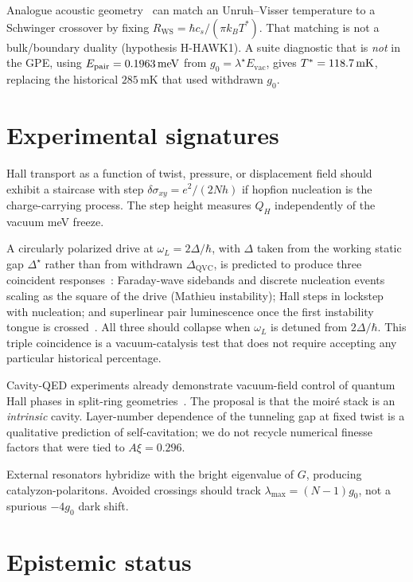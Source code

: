 \documentclass[11pt,letterpaper]{article}
\begin{document}
Analogue acoustic geometry~\cite{Unruh1981,Barcelo2011,Volovik2003,Steinhauer2016} can match an Unruh--Visser temperature to a Schwinger crossover by fixing $R_{\mathrm{WS}}=\hbar c_s/(\pi k_B T^*)$. That matching is not a bulk/boundary duality (hypothesis H-HAWK1). A suite diagnostic that is \emph{not} in the GPE, using $E_{\mathrm{pair}}=0.1963\,\mathrm{meV}$ from $g_0=\lambda^\star E_{\mathrm{vac}}$, gives $T^*=118.7\,\mathrm{mK}$, replacing the historical $285$\,mK that used withdrawn $g_0$.

\section{Experimental signatures}
\label{sec:experiments}

Hall transport as a function of twist, pressure, or displacement field should exhibit a staircase with step $\delta\sigma_{xy}=e^2/(2Nh)$ if hopfion nucleation is the charge-carrying process. The step height measures $Q_H$ independently of the vacuum meV freeze.

A circularly polarized drive at $\omega_L=2\Delta/\hbar$, with $\Delta$ taken from the working static gap $\Delta^\star$ rather than from withdrawn $\Delta_{\mathrm{QVC}}$, is predicted to produce three coincident responses~\cite{Engels2007,Vudragovic2019}: Faraday-wave sidebands and discrete nucleation events scaling as the square of the drive (Mathieu instability); Hall steps in lockstep with nucleation; and superlinear pair luminescence once the first instability tongue is crossed~\cite{Heisenberg1936,Schwinger1951,Dunne2009}. All three should collapse when $\omega_L$ is detuned from $2\Delta/\hbar$. This triple coincidence is a vacuum-catalysis test that does not require accepting any particular historical percentage.

Cavity-QED experiments already demonstrate vacuum-field control of quantum Hall phases in split-ring geometries~\cite{Enkner2025,Jiang2025,Bretscher2026}. The \TEVC{} proposal is that the moir\'e stack is an \emph{intrinsic} cavity. Layer-number dependence of the tunneling gap at fixed twist is a qualitative prediction of self-cavitation; we do not recycle numerical finesse factors that were tied to $A\xi=0.296$.

External resonators hybridize with the bright eigenvalue of $G$, producing catalyzon-polaritons. Avoided crossings should track $\lambda_{\max}=(N-1)g_0$, not a spurious $-4g_0$ dark shift.

\section{Epistemic status}
\label{sec:status}
\end{document}
